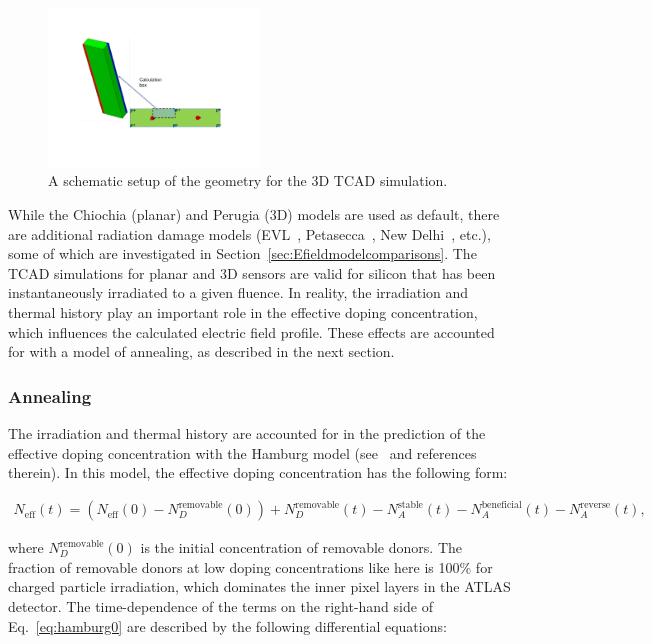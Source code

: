 
\begin{figure}[!htpb]
\centering
\includegraphics[width=0.5\textwidth]{3D_fig}
\caption{A schematic setup of the geometry for the 3D TCAD simulation.}
\label{fig:3Dsetup}
\end{figure}

While the Chiochia (planar) and Perugia (3D) models are used as default, there are additional radiation damage models (EVL~\cite{bib:DP}, Petasecca~\cite{1710302}, New Delhi~\cite{dalal2014simulation}, etc.), some of which are investigated in Section~\ref{sec:Efieldmodelcomparisons}.  The TCAD simulations for planar and 3D sensors are valid for silicon that has been instantaneously irradiated to a given fluence.   In reality, the irradiation and thermal history play an important role in the effective doping concentration, which influences the calculated electric field profile.  These effects are accounted for with a model of annealing, as described in the next section.


\subsubsection{Annealing}
\label{sec:annealing}

 The irradiation and thermal history are accounted for in the prediction of the effective doping concentration with the Hamburg model (see~\cite{moll-thesis} and references therein).  In this model, the effective doping concentration has the following form:

\begin{align}
\label{eq:hamburg0}
N_\text{eff}(t)=(N_\text{eff}(0)-N_{D}^\text{removable}(0))+N_{D}^\text{removable}(t)-N_{A}^\text{stable}(t)-N_{A}^\text{beneficial}(t)-N_{A}^\text{reverse}(t),
\end{align}

where $N_D^\text{removable}(0)$ is the initial concentration of removable donors.  The fraction of removable donors at low doping concentrations like here is 100\% for charged particle irradiation, which dominates the inner pixel layers in the ATLAS detector.  The time-dependence of the terms on the right-hand side of Eq.~\ref{eq:hamburg0} are described by the following differential equations:

